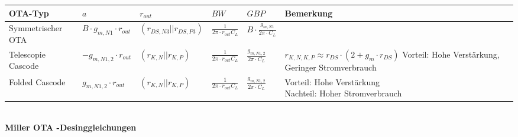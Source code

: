\begin{tabular}{|l|l|l|l|l|l|}
\hline
OTA-Typ & $a$ & $r_{out}$ & $BW$ & $GBP$ & Bemerkung \\
\hline
Symmetrischer OTA & $B\cdot g_{m,N1}\cdot r_{out}$ & $(r_{DS,N3}||r_{DS,P3})$ & $\frac{1}{2\pi\cdot r_{out}C_L}$ & $B\cdot \frac{g_{m,N1}}{2\pi\cdot C_L}$ & \\
\hline
Telescopie Cascode & $-g_{m,N1,2}\cdot r_{out}$ & $(r_{K,N}||r_{K,P})$ & $\frac{1}{2\pi \cdot r_{out}C_L}$ & $\frac{g_{m,N1,2}}{2\pi \cdot C_L}$ & \makecell[l]{$r_{K,N,K,P}\approx r_{DS}\cdot (2+g_m\cdot r_{DS})$\\Vorteil: Hohe Verstärkung,\\ Geringer Stromverbrauch}\\
\hline
Folded Cascode & $g_{m,N1,2}\cdot r_{out}$ & $(r_{K,N}||r_{K,P})$ & $\frac{1}{2\pi\cdot r_{out}C_L}$ & $\frac{g_{m,N1,2}}{2\pi\cdot C_L}$ & \makecell[l]{Vorteil: Hohe Verstärkung\\Nachteil: Hoher Stromverbrauch}\\
\hline
\end{tabular}\vspace{10pt}\\
\textbf{Miller OTA -Desinggleichungen}\\
\renewcommand{\arraystretch}{1.5}
